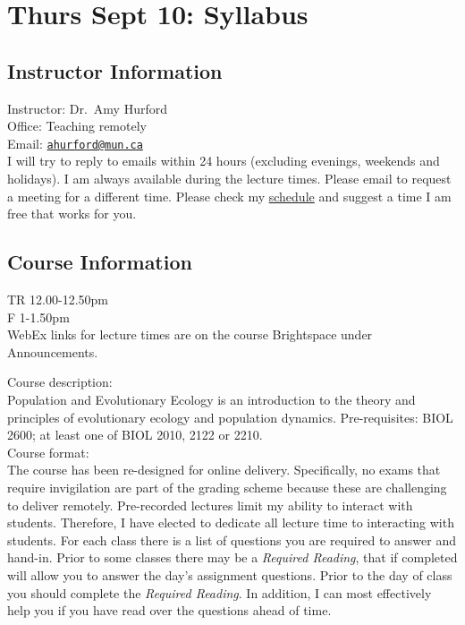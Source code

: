 \documentclass[]{book}
\author{}
\date{\vspace{-2.5em}}
\begin{document}
{
\setcounter{tocdepth}{1}
\tableofcontents
}
\chapter{Thurs Sept 10: Syllabus}\label{thurs-sept-10-syllabus}

\section{Instructor Information}\label{instructor-information}

Instructor: Dr.~Amy Hurford\\
Office: Teaching remotely\\
Email: \href{mailto:ahurford@mun.ca}{\nolinkurl{ahurford@mun.ca}}\\
I will try to reply to emails within 24 hours (excluding evenings,
weekends and holidays). I am always available during the lecture times.
Please email to request a meeting for a different time. Please check my
\href{https://amyhurford.weebly.com/}{schedule} and suggest a time I am
free that works for you.

\section{Course Information}\label{course-information}

TR 12.00-12.50pm\\
F 1-1.50pm\\
WebEx links for lecture times are on the course Brightspace under
Announcements.

Course description:\\
Population and Evolutionary Ecology is an introduction to the theory and
principles of evolutionary ecology and population dynamics.
Pre-requisites: BIOL 2600; at least one of BIOL 2010, 2122 or
2210.\\[2\baselineskip]Course format:\\
The course has been re-designed for online delivery. Specifically, no
exams that require invigilation are part of the grading scheme because
these are challenging to deliver remotely. Pre-recorded lectures limit
my ability to interact with students. Therefore, I have elected to
dedicate all lecture time to interacting with students. For each class
there is a list of questions you are required to answer and hand-in.
Prior to some classes there may be a \emph{Required Reading}, that if
completed will allow you to answer the day's assignment questions. Prior
to the day of class you should complete the \emph{Required Reading}. In
addition, I can most effectively help you if you have read over the
questions ahead of time.
\end{document}
